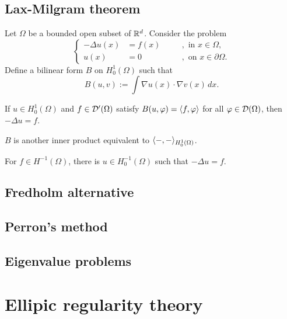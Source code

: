 \documentclass{../../large}
\begin{document}
\section{Lax-Milgram theorem}
\begin{prb}
Let $\Omega$ be a bounded open subset of $\mathbb{R}^d$.
Consider the problem
\[\left\{\begin{alignedat}{2}
-\Delta u(x)&=f(x)&\quad&,\text{ in }x\in\Omega,\\
u(x)&=0&&,\text{ on }x\in\partial\Omega.
\end{alignedat}\right.\]
Define a bilinear form $B$ on $H_0^1(\Omega)$ such that
\[B(u,v):=\int\nabla u(x)\cdot\nabla v(x)\,dx.\]
\begin{parts}
\item If $u\in H_0^1(\Omega)$ and $f\in\mathcal{D}'(\Omega)$ satisfy $B(u,\varphi)=\langle f,\varphi\rangle$ for all $\varphi\in\mathcal{D}(\Omega)$, then $-\Delta u=f$.
\item $B$ is another inner product equivalent to $\langle-,-\rangle_{H_0^1(\Omega)}$.
\item For $f\in H^{-1}(\Omega)$, there is $u\in H_0^{-1}(\Omega)$ such that $-\Delta u=f$.
\end{parts}
\end{prb}

\section{Fredholm alternative}

\section{Perron's method}

\section{Eigenvalue problems}






\chapter{Ellipic regularity theory}
\end{document}
